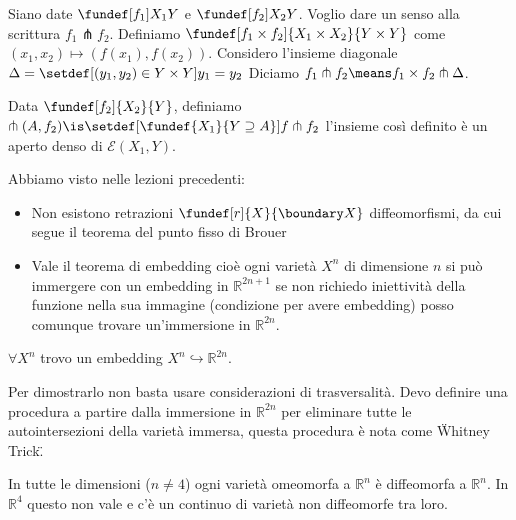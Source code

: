 
\begin{defn}
Siano date $\fundef[f_{1}]{X_{1}}{Y}$ e $\fundef[f_{2}]{X_{2}}{Y}$. Voglio dare un senso alla scrittura $f_{1} \pitchfork f_{2}$.
Definiamo $\fundef[f_1 \times f_2]{X_1 \times X_2}{Y \times Y}$ come $(x_{1}, x_{2}) \mapsto (f(x_{1}), f(x_{2}))$. Considero l'insieme diagonale $\Delta = \setdef[(y_{1}, y_{2}) \in Y \times Y]{y_{1} = y_{2}}$
Diciamo $f_{1} \pitchfork f_{2} \means f_{1} \times f_{2} \pitchfork \Delta$.
\end{defn}

\begin{teo}
Data $\fundef[f_2]{X_2}{Y}$, definiamo $\pitchfork(A, f_{2}) \is \setdef[\fundef{X_{1}}{Y \supseteq A}] {f\pitchfork f_{2}}$ l'insieme così definito è un aperto denso di $\mathcal{E}(X_{1}, Y)$.
\end{teo}

Abbiamo visto nelle lezioni precedenti:

\begin{itemize}
 \item Non esistono retrazioni $\fundef[r]{X}{\boundary X}$ diffeomorfismi, da cui segue il teorema del punto fisso di Brouer
 \item Vale il teorema di embedding cioè ogni varietà $X^{n}$ di dimensione $n$ si può immergere con un embedding in $\mathbb{R}^{2n+1}$ se non richiedo iniettività della funzione nella sua 
 immagine (condizione per avere embedding) posso comunque trovare un'immersione in $\mathbb{R}^{2n}$. 
\end{itemize}

\begin{teo}  
$\forall X^{n}$ trovo un embedding $X^{n} \hookrightarrow \mathbb{R}^{2n}$.
\end{teo}

\begin{oss}
 Per dimostrarlo non basta usare considerazioni di trasversalità. Devo definire una procedura a partire dalla immersione in $\mathbb{R}^{2n}$ per
 eliminare tutte le autointersezioni della varietà immersa, questa procedura è nota come \"Whitney Trick\".
\end{oss}

\begin{oss} %
 In tutte le dimensioni ($n \neq 4$) ogni varietà omeomorfa a $\mathbb{R}^{n}$ è diffeomorfa a  $\mathbb{R}^{n}$. In $\mathbb{R}^{4}$ questo non vale e c'è un continuo di varietà 
 non diffeomorfe tra loro.
\end{oss}

